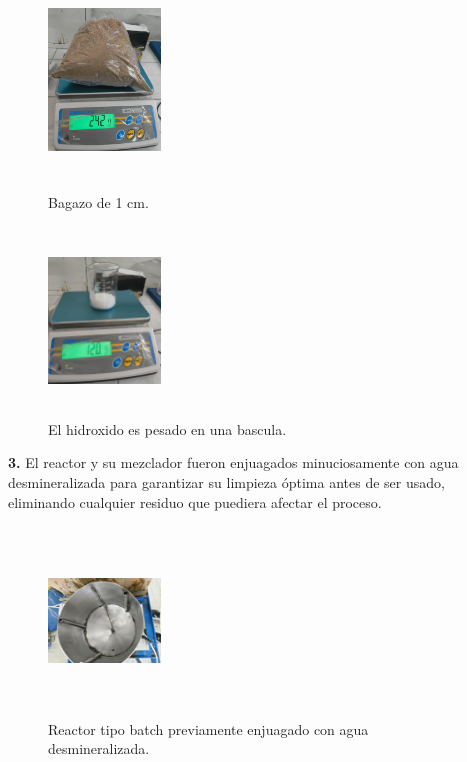 \documentclass[12pt]{article}
\begin{document}
			
			\begin{figure}[H]
				\centering
				\begin{minipage}{0.46\textwidth}
					\centering
					\includegraphics[width=3cm, height=5cm]{imagenes/pesado4}
					\caption{Bagazo de 1 cm.}
					\label{bagazo1}
				\end{minipage}
				\hfill
				\begin{minipage}{0.48\textwidth}
					\centering
					\includegraphics[width=3cm, height=5cm]{imagenes/hidroxido_pesado}
					\caption{El hidroxido es pesado en una bascula.}
					\label{cernir_bagazo_hidroxidopesado}
				\end{minipage}
			\end{figure}
			
			
			
			\textbf{3.} El reactor y su mezclador fueron enjuagados minuciosamente con agua desmineralizada para garantizar su limpieza óptima antes de ser usado, eliminando cualquier residuo que puediera afectar el proceso.
			\begin{figure} [H]
				\centering
				\includegraphics[width=3cm, height=5cm,angle=90]{imagenes/reactor limpio}
				\caption{Reactor tipo batch previamente enjuagado con agua desmineralizada.}
				\label{reactor limpio}
			\end{figure}
			
\end{document}
